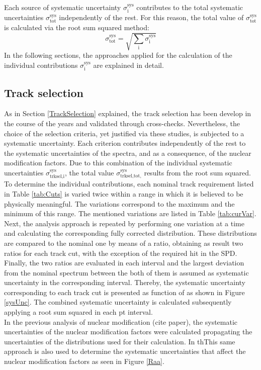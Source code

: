 \documentclass[12pt,a4paper]{report}
\begin{document}
Each source of systematic uncertainty $\sigma^\text{sys}_\text{i}$ contributes to the total systematic uncertainties $\sigma^\text{sys}_\text{tot}$ independently of the rest. For this reason, the total value of $\sigma^\text{sys}_\text{tot}$ is calculated via the root sum squared method:
\begin{equation}
\sigma^\text{sys}_\text{tot} = \sqrt{\sum_{\text{i}}\sigma^\text{sys}_\text{i}}
\end{equation}
In the following sections, the approaches applied for the calculation of the individual contributions $\sigma^\text{sys}_\text{i}$ are explained in detail. 
\subsection{Track selection} 
As in Section \ref{TrackSelection} explained, the track selection has been develop in the course of the years and validated through cross-checks. Nevertheless, the choice of the selection criteria, yet justified via these studies, is subjected to a systematic uncertainty. Each criterion contributes independently of the rest to the systematic uncertainties of the \pt spectra, and as a consequence, of the nuclear modification factors. Due to this combination of the individual systematic uncertainties $\sigma^\text{sys}_\text{trksel,i}$, the total value $\sigma^\text{sys}_\text{trksel,tot,}$ results from the root sum squared.\\
To determine the individual contributions, each nominal track requirement listed in Table \ref{tab:Cuts} is varied twice within a range in which it is believed to be physically meaningful. The variations correspond to the maximum and the minimum of this range. The mentioned variations are listed in Table \ref{tab:curVar}. Next, the analysis approach is repeated by performing one variation at a time and calculating the corresponding fully corrected \pt distribution. These \pt distributions are compared to the nominal one by means of a ratio, obtaining as result two ratios for each track cut, with the exception of the required hit in the SPD. Finally, the two ratios are evaluated in each \pt interval and the largest deviation from the nominal \pt spectrum between the both of them is assumed as systematic uncertainty in the corresponding \pt interval. Thereby, the systematic uncertainty corresponding to each track cut is presented as function of \pt as shown in Figure \ref{sysUnc}. The combined systematic uncertainty is calculated subsequently applying a root sum squared in each pt interval. \\
In the previous analysis of nuclear modification (cite paper), the systematic uncertainties of the nuclear modification factors were calculated propagating the uncertainties of the \pt distributions used for their calculation. In thThis same approach is also used to determine the systematic uncertainties that affect the nuclear modification factors as seen in Figure \ref{Raa}.
\end{document}
